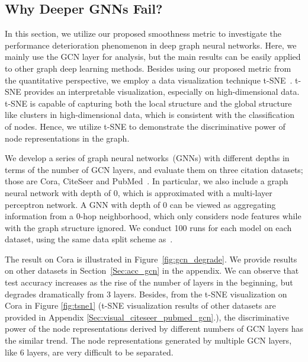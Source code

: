 \documentclass[sigconf]{acmart}
\begin{document}
\subsection{Why Deeper GNNs Fail?}\label{Sec:why}
In this section, we utilize our proposed smoothness metric to
investigate the performance deterioration phenomenon in deep graph neural
networks. Here, we mainly use the GCN layer for analysis, but the
main results can be easily applied to other graph deep learning
methods. Besides using our proposed metric from the quantitative
perspective, we employ a data visualization technique
t-SNE~\cite{maaten2008visualizing}. t-SNE provides an
interpretable visualization, especially on high-dimensional data.
t-SNE is capable of capturing both the local structure and the
global structure like clusters in high-dimensional data, which is
consistent with the classification of nodes. Hence, we utilize
t-SNE to demonstrate the discriminative power of node
representations in the graph.

We develop a series of graph neural networks~(GNNs) with
different depths in terms of the number of GCN layers, and evaluate
them on three citation datasets; those are Cora, CiteSeer and
PubMed~\cite{sen2008collective}. In particular, we also include a
graph neural network with depth of 0, which is approximated with
a multi-layer perceptron network. A GNN with depth of 0 can be
viewed as aggregating information from a 0-hop neighborhood,
which only considers node features while with the graph structure
ignored. We conduct 100 runs for each model on each dataset, using the same data split scheme
as~\cite{kipf2016semi}.

The result on Cora is illustrated in
Figure~\ref{fig:gcn_degrade}. We provide results on other
datasets in Section~\ref{Sec:acc_gcn} in the appendix. We can
observe that test accuracy increases as the rise of the number of
layers in the beginning, but degrades dramatically from 3 layers.
Besides, from the t-SNE visualization on Cora in Figure
\ref{fig:tsne1} (t-SNE visualization results of other datasets
are provided in Appendix \ref{Sec:visual_citeseer_pubmed_gcn}.),
the discriminative power of the node representations derived by
different numbers of GCN layers has the similar trend. The node
representations generated by multiple GCN layers, like 6 layers,
are very difficult to be separated.
\end{document}
